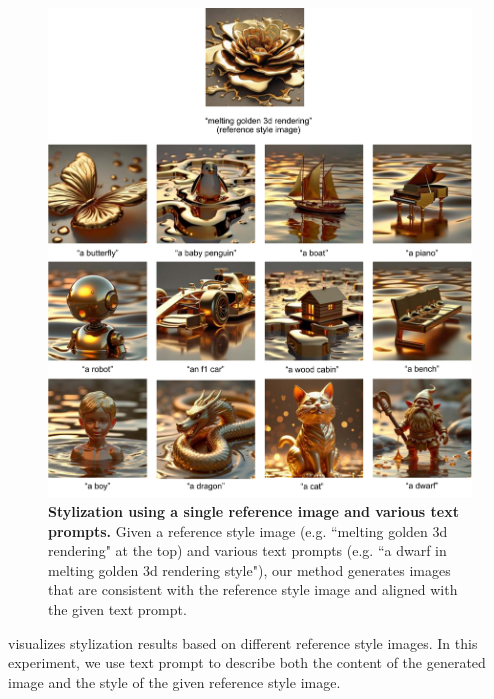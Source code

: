 \documentclass{article} %
\theoremstyle{plain}
\begin{document}
\begin{figure}[!tbh]
\includegraphics[width=\linewidth]{pics/stylization_single_style_many_text_low.pdf}
\caption{
\textbf{Stylization using a single reference image and various text prompts.}
Given a reference style image (e.g. ``melting golden 3d rendering" at the top) and various text prompts (e.g. ``a dwarf in melting golden 3d rendering style"), our method generates images that are consistent with the reference style image and aligned with the given text prompt. 
}
\label{fig:reference-style-all}
\end{figure}






 visualizes stylization results based on different reference style images. In this experiment, we use text prompt to describe both the content of the generated image and the style of the given reference style image. 
\end{document}
